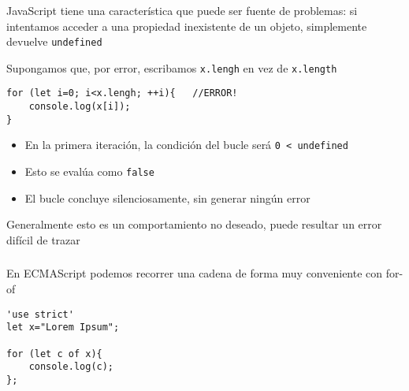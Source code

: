 \documentclass[ucs]{beamer}
\begin{document}
\begin{frame}[fragile]
\frametitle{}
JavaScript tiene una característica que puede ser
fuente de problemas: si intentamos acceder a una propiedad
inexistente de un objeto, simplemente devuelve
\verb|undefined|

Supongamos que, por error, escribamos
\verb|x.lengh|
en vez de 
\verb|x.length|


  \begin{scriptsize}
  \begin{verbatim}
for (let i=0; i<x.lengh; ++i){   //ERROR!
    console.log(x[i]);
}
  \end{verbatim}
  \end{scriptsize}


\begin{itemize}
\item
En la primera iteración, la condición del bucle
será \verb|0 < undefined|

\item
Esto se evalúa como
\verb|false|

\item
El bucle concluye silenciosamente, sin generar ningún error
\end{itemize}


Generalmente esto es un comportamiento no deseado, puede resultar un
error difícil de trazar

\end{frame}



\begin{frame}[fragile]
\frametitle{}
En ECMAScript podemos recorrer una cadena de forma muy conveniente
con for-of

  \begin{scriptsize}
  \begin{verbatim}
'use strict'
let x="Lorem Ipsum";

for (let c of x){
    console.log(c);
};
  \end{verbatim}
  \end{scriptsize}

\end{frame}
\end{document}
